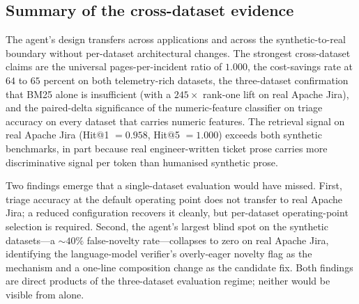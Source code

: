 \subsection{Summary of the cross-dataset evidence}
\label{sec:cross-app:summary}

The agent's design transfers across applications and across the synthetic-to-real boundary without per-dataset architectural changes. The strongest cross-dataset claims are the universal pages-per-incident ratio of $1.000$, the cost-savings rate at $64$ to $65$ percent on both telemetry-rich datasets, the three-dataset confirmation that BM25 alone is insufficient (with a $245\times$ rank-one lift on real Apache Jira), and the paired-delta significance of the numeric-feature classifier on triage accuracy on every dataset that carries numeric features. The retrieval signal on real Apache Jira (Hit@1 $= 0.958$, Hit@5 $= 1.000$) exceeds both synthetic benchmarks, in part because real engineer-written ticket prose carries more discriminative signal per token than humanised synthetic prose.

Two findings emerge that a single-dataset evaluation would have missed. First, triage accuracy at the default operating point does not transfer to real Apache Jira; a reduced configuration recovers it cleanly, but per-dataset operating-point selection is required. Second, the agent's largest blind spot on the synthetic datasets---a $\sim$$40\%$ false-novelty rate---collapses to zero on real Apache Jira, identifying the language-model verifier's overly-eager novelty flag as the mechanism and a one-line composition change as the candidate fix. Both findings are direct products of the three-dataset evaluation regime; neither would be visible from \dsob{} alone.
